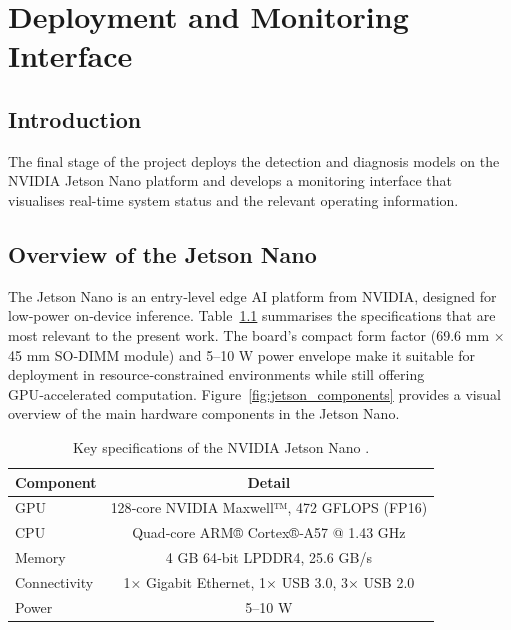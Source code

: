 \chapter{Deployment and Monitoring Interface}
\label{ch:deployment}
\section{Introduction}
The final stage of the project deploys the detection and diagnosis models on the NVIDIA Jetson Nano platform and develops a monitoring interface that visualises real-time system status and the relevant operating information.

\section{Overview of the Jetson Nano}
The Jetson Nano is an entry‑level edge AI platform from NVIDIA, designed for low‑power on‑device inference.
Table~\ref{tab:jetson_nano_specs} summarises the specifications that are most relevant to the present work.
The board's compact form factor (69.6 mm × 45 mm SO‑DIMM module) and 5–10 W power envelope make it suitable for deployment in resource‑constrained environments while still offering GPU‑accelerated computation\citep{jetson_specs}.
Figure~\ref{fig:jetson_components} provides a visual overview of the main hardware components in the Jetson Nano.

\begin{table}[H]
\centering
\caption{Key specifications of the NVIDIA Jetson Nano .}
\label{tab:jetson_nano_specs}
\begin{tabular}{@{}lc@{}}
\toprule
Component & Detail \\
\midrule
GPU & 128‑core NVIDIA Maxwell™, 472 GFLOPS (FP16) \\
CPU & Quad‑core ARM® Cortex®‑A57 @ 1.43 GHz \\
Memory & 4 GB 64‑bit LPDDR4, 25.6 GB/s \\
Connectivity & 1× Gigabit Ethernet, 1× USB 3.0, 3× USB 2.0 \\
Power & 5–10 W \\
\bottomrule
\end{tabular}
\end{table}

